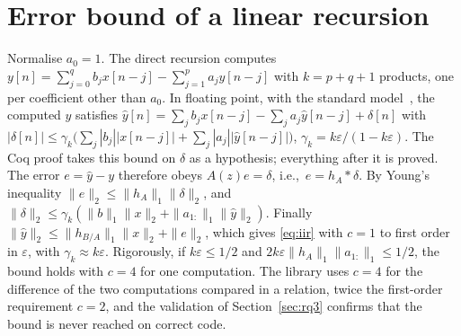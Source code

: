 \documentclass[10pt,conference]{IEEEtran}
\newcommand{\eps}{\varepsilon}
\newcommand{\ie}{i.e.,\ }
\begin{document}
\section{Error bound of a linear recursion}
\label{app:iir}
Normalise $a_0=1$. The direct recursion computes
$y[n]=\sum_{j=0}^{q}b_jx[n-j]-\sum_{j=1}^{p}a_jy[n-j]$ with $k=p+q+1$ products,
one per coefficient other than $a_0$.
In floating point, with the standard model~\cite{higham2002accuracy}, the
computed $\hat y$ satisfies
$\hat y[n]=\sum_jb_jx[n-j]-\sum_ja_j\hat y[n-j]+\delta[n]$ with
$|\delta[n]|\le\gamma_k\bigl(\sum_j|b_j||x[n-j]|+\sum_j|a_j||\hat y[n-j]|\bigr)$,
$\gamma_k=k\eps/(1-k\eps)$. The Coq proof takes this bound on $\delta$ as a
hypothesis; everything after it is proved. The error $e=\hat y-y$ therefore obeys
$A(z)e=\delta$, \ie $e=h_A*\delta$. By Young's inequality
$\|e\|_2\le\|h_A\|_1\|\delta\|_2$, and
$\|\delta\|_2\le\gamma_k(\|b\|_1\|x\|_2+\|a_{1:}\|_1\|\hat y\|_2)$. Finally
$\|\hat y\|_2\le\|h_{B/A}\|_1\|x\|_2+\|e\|_2$, which gives
\eqref{eq:iir} with $c=1$ to first order in $\eps$, with $\gamma_k\approx k\eps$.
Rigorously, if $k\eps\le1/2$ and $2k\eps\|h_A\|_1\|a_{1:}\|_1\le1/2$, the bound
holds with $c=4$ for one computation. The library uses $c=4$ for the difference
of the two computations compared in a relation, twice the first-order
requirement $c=2$, and the
validation of Section~\ref{sec:rq3} confirms that the bound is never reached on
correct code.
\end{document}

